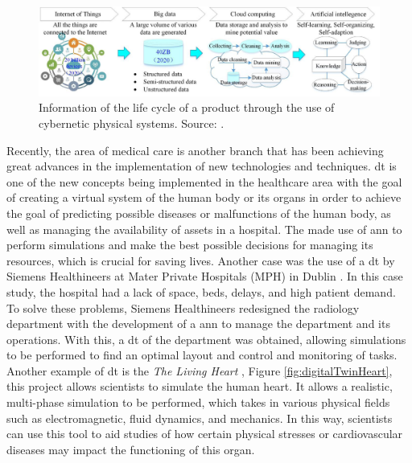 \begin{figure}[ht!]
    \centering
    \includegraphics[scale=0.75]{images/Related/cps.png}
    \caption{Information of the life cycle of a product through the use of cybernetic physical systems. Source: \cite{Qi2018}.}

    \label{fig:digitalTwinBigData}
\end{figure}

Recently, the area of medical care is another branch that has been achieving great advances in the implementation of new technologies and techniques. \acrlong{dt} is one of the new concepts being implemented in the healthcare area with the goal of creating a virtual system of the human body or its organs in order to achieve the goal of predicting possible diseases or malfunctions of the human body, as well as managing the availability of assets in a hospital. The \textcite{johns_2016} made use of \acrshort{ann} to perform simulations and make the best possible decisions for managing its resources, which is crucial for saving lives. Another case was the use of a \acrshort{dt} by Siemens Healthineers at Mater Private Hospitals (MPH) in Dublin \cite{gilligan_digital_2018}. In this case study, the hospital had a lack of space, beds, delays, and high patient demand. To solve these problems, Siemens Healthineers redesigned the radiology department with the development of a \acrshort{ann} to manage the department and its operations. With this, a \acrshort{dt} of the department was obtained, allowing simulations to be performed to find an optimal layout and control and monitoring of tasks. Another example of \acrfull{dt} is the \emph{The Living Heart} \cite{Levine2022}, Figure \ref{fig:digitalTwinHeart}, this project allows scientists to simulate the human heart. It allows a realistic, multi-phase simulation to be performed, which takes in various physical fields such as electromagnetic, fluid dynamics, and mechanics. In this way, scientists can use this tool to aid studies of how certain physical stresses or cardiovascular diseases may impact the functioning of this organ. 

